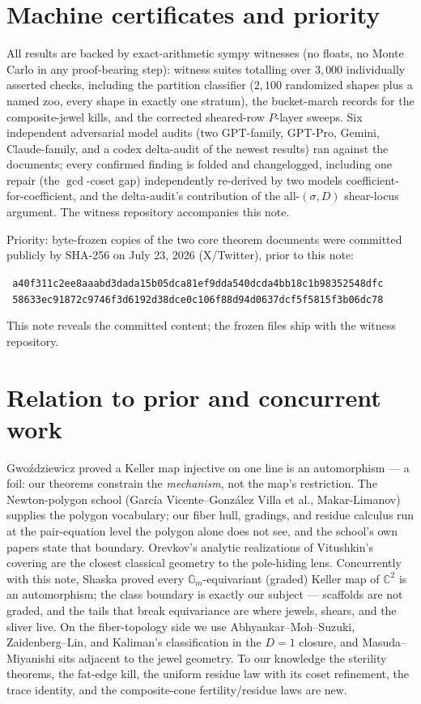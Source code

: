 \documentclass[11pt]{article}
\newcommand{\C}{\mathbb{C}}
\begin{document}
\section{Machine certificates and priority}

All results are backed by exact-arithmetic sympy witnesses (no floats, no
Monte Carlo in any proof-bearing step): witness suites totalling over
$3{,}000$ individually asserted checks, including the partition classifier
($2{,}100$ randomized shapes plus a named zoo, every shape in exactly one
stratum), the bucket-march records for the composite-jewel kills, and the
corrected sheared-row $P$-layer sweeps. Six independent adversarial model
audits (two GPT-family, GPT-Pro, Gemini, Claude-family, and a codex
delta-audit of the newest results) ran against the documents; every
confirmed finding is folded and changelogged, including one repair
(the $\gcd$-coset gap) independently re-derived by two models
coefficient-for-coefficient, and the delta-audit's contribution of the
all-$(\sigma, D)$ shear-locus argument. The witness repository accompanies
this note.

Priority: byte-frozen copies of the two core theorem documents were
committed publicly by SHA-256 on July 23, 2026 (X/Twitter), prior to this
note:
\begin{center}\footnotesize\texttt{
a40f311c2ee8aaabd3dada15b05dca81ef9dda540dcda4bb18c1b98352548dfc}\\
\footnotesize\texttt{
58633ec91872c9746f3d6192d38dce0c106f88d94d0637dcf5f5815f3b06dc78}
\end{center}
This note reveals the committed content; the frozen files ship with the
witness repository.

\section{Relation to prior and concurrent work}

Gwo\'zdziewicz \cite{Gwozdziewicz1993} proved a Keller map injective on one
line is an automorphism --- a foil: our theorems constrain the
\emph{mechanism}, not the map's restriction. The Newton-polygon school
(Garc\'ia Vicente--Gonz\'alez Villa et al., Makar-Limanov) supplies the
polygon vocabulary; our fiber hull, gradings, and residue calculus run at
the pair-equation level the polygon alone does not see, and the school's own
papers state that boundary. Orevkov's analytic realizations of Vitushkin's
covering \cite{Orevkov} are the closest classical geometry to the
pole-hiding lens. Concurrently with this note, Shaska \cite{Shaska2026}
proved every $\mathbb{G}_m$-equivariant (graded) Keller map of $\C^2$ is an
automorphism; the class boundary is exactly our subject --- scaffolds are
not graded, and the tails that break equivariance are where jewels, shears,
and the sliver live. On the fiber-topology side we use
Abhyankar--Moh--Suzuki, Zaidenberg--Lin, and Kaliman's classification in the
$D = 1$ closure, and Masuda--Miyanishi sits adjacent to the jewel geometry.
To our knowledge the sterility theorems, the fat-edge kill, the uniform
residue law with its coset refinement, the trace identity, and the
composite-cone fertility/residue laws are new.
\end{document}
